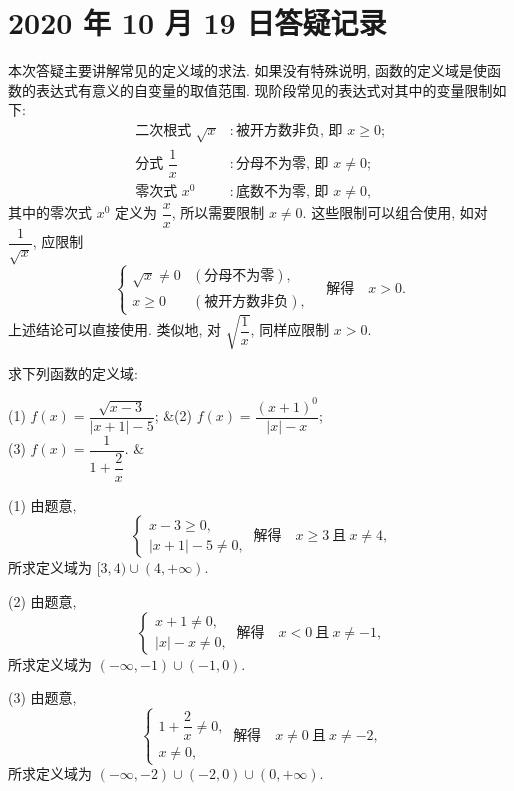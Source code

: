 \section{2020 年 10 月 19 日答疑记录}

本次答疑主要讲解常见的定义域的求法. 如果没有特殊说明, 函数的定义域是使函数的表达式有意义的自变量的取值范围. 现阶段常见的表达式对其中的变量限制如下:
\begin{align*}
    \text{二次根式 $\sqrt{x}$}&\colon \text{被开方数非负, 即 $x\geqslant 0$;}\\
    \text{分式 $\dfrac1{x}$}&\colon \text{分母不为零, 即 $x\neq 0$;}\\
    \text{零次式 $x^0$}&\colon \text{底数不为零, 即 $x\neq 0$,}
\end{align*}
其中的零次式 $x^0$ 定义为 $\dfrac{x}x$, 所以需要限制 $x\neq 0$. 这些限制可以组合使用, 如对 $\dfrac1{\sqrt{x}}$, 应限制
\[\begin{cases}
    \sqrt{x}\neq 0 & (\text{分母不为零}),\\
    x\geqslant 0   & (\text{被开方数非负}),
    \end{cases}\quad\text{解得}\quad x>0.\]
上述结论可以直接使用. 类似地, 对 $\sqrt{\dfrac1x}$, 同样应限制 $x>0$.

\begin{example}\label{exa:201101-1415}
    求下列函数的定义域:
    \begin{twocolpro}
        (1) $f(x)=\dfrac{\sqrt{x-3}}{|x+1|-5}$;
        &(2) $f(x)=\dfrac{(x+1)^0}{|x|-x}$;\\
        (3) $f(x)=\dfrac1{1+\dfrac2x}$. &
    \end{twocolpro}
\end{example}
\begin{solution}
    (1) 由题意,
    \[\left\{\!\!\begin{array}{l}
        x-3\geqslant 0,\\
        |x+1|-5\neq0,
        \end{array}\right.\ \text{解得}\quad
        x\geqslant 3\ \text{且}\ x\neq4,\]
    所求定义域为 $[3,4)\cup(4,+\infty)$.
    
    (2) 由题意,
    \[\left\{\!\!\begin{array}{l}
        x+1\neq 0,\\
        |x|-x\neq0,
        \end{array}\right.\ \text{解得}\quad
        x<0\ \text{且}\ x\neq -1,\]
    所求定义域为 $(-\infty,-1)\cup(-1,0)$.
    
    (3) 由题意,
    \[\left\{\!\!\begin{array}{l}
        1+\dfrac2x\neq 0,\\
        x\neq0,
        \end{array}\right.\ \text{解得}\quad
        x\neq 0\ \text{且}\ x\neq -2,\]
    所求定义域为 $(-\infty,-2)\cup (-2,0)\cup (0,+\infty)$.
\end{solution}

